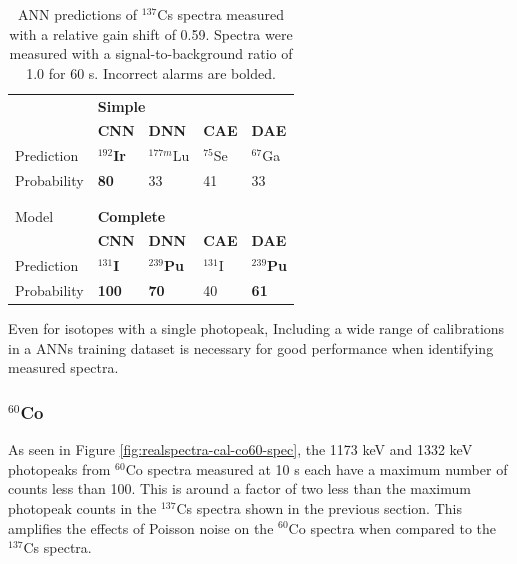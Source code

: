 \begin{table}[H]
	\centering
	\caption{ANN predictions of $^{137}$Cs spectra measured with a relative gain shift of 0.59. Spectra were measured with a signal-to-background ratio of 1.0 for 60 s. Incorrect alarms are bolded.}
	\label{table:cs137_precictions_60s}
	\begin{tabular}{lllll}
		\hline
		 & \multicolumn{4}{l}{\textbf{Simple}} \\
		 & \textbf{CNN} & \textbf{DNN} & \textbf{CAE} & \textbf{DAE} \\ \hline
		Prediction & \textbf{$^{192}$Ir} & $^{177m}$Lu &  $^{75}$Se  & $^{67}$Ga \\
		Probability & \textbf{80} & 33 & 41 & 33 \\ \hline \\ \\
		
		\hline
		Model & \multicolumn{4}{l}{\textbf{Complete}} \\
		& \textbf{CNN} & \textbf{DNN} & \textbf{CAE} & \textbf{DAE} \\ \hline
		Prediction  & \textbf{$^{131}$I} & \textbf{$^{239}$Pu} & $^{131}$I & \textbf{$^{239}$Pu}  \\ 
		Probability & \textbf{100} & \textbf{70} & 40 & \textbf{61} \\ \hline
	\end{tabular}
\end{table}


Even for isotopes with a single photopeak, Including a wide range of calibrations in a ANNs training dataset is necessary for good performance when identifying measured spectra.


\subsubsection{$^{60}$Co}

As seen in Figure \ref{fig:realspectra-cal-co60-spec}, the 1173 keV and 1332 keV photopeaks from $^{60}$Co spectra measured at 10 s each have a maximum number of counts less than 100. This is around a factor of two less than the maximum photopeak counts in the $^{137}$Cs spectra shown in the previous section. This amplifies the effects of Poisson noise on the $^{60}$Co spectra when compared to the $^{137}$Cs spectra.

